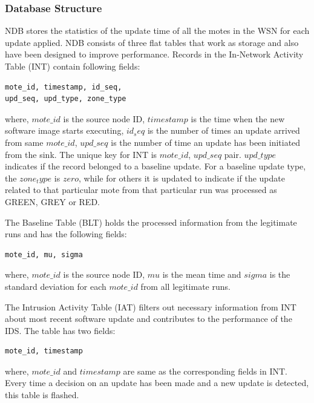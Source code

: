 \documentclass[conference,final]{IEEEtran}
\begin{document}
\subsubsection{Database Structure}
\label{ssc:db}
NDB stores the statistics of the update time of all the motes in the WSN for each update applied.
NDB consists of three flat tables that work as storage and also have been designed to improve performance. 
Records in the In-Network Activity Table (INT) contain following fields:
\begin{verbatim}
mote_id, timestamp, id_seq, 
upd_seq, upd_type, zone_type
\end{verbatim}
where, $mote\_id$ is the source node ID, $timestamp$ is the time when the new software image starts executing, $id_seq$ is the number of times an update arrived from same $mote\_id$, $upd\_seq$ is the number of time an update has been initiated from the sink.
The unique key for INT is $mote\_id$, $upd\_seq$ pair.
$upd\_type$ indicates if the record belonged to a baseline update.
For a baseline update type, the $zone_type$ is $zero$, while for others it is updated to indicate if the update related to that particular mote from that particular run was processed as GREEN, GREY or RED.

The Baseline Table (BLT) holds the processed information from the legitimate runs and has the following fields:
\begin{verbatim}
mote_id, mu, sigma
\end{verbatim}
where, $mote\_id$ is the source node ID, $mu$ is the mean time and $sigma$ is the standard deviation for each $mote\_id$ from all legitimate runs.

The Intrusion Activity Table (IAT) filters out necessary information from INT about most recent software update and contributes to the performance of the IDS.
The table has two fields:
\begin{verbatim}
mote_id, timestamp
\end{verbatim}
where, $mote\_id$  and $timestamp$ are same as the corresponding fields in INT.
Every time a decision on an update has been made and a new update is detected, this table is flashed.
\end{document}
